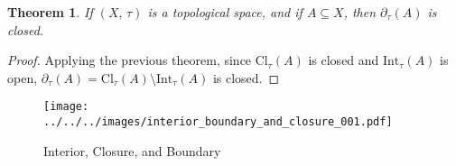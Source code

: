 \documentclass{article}
\theoremstyle{plain}
\newtheorem{theorem}{Theorem}[section]
\theoremstyle{normal}
\begin{document}
        \begin{theorem}
            If $(X,\,\tau)$ is a topological space, and if $A\subseteq{X}$,
            then $\partial_{\tau}(A)$ is closed.
        \end{theorem}
        \begin{proof}
            Applying the previous theorem, since $\textrm{Cl}_{\tau}(A)$ is
            closed and $\textrm{Int}_{\tau}(A)$ is open,
            $\partial_{\tau}(A)=\textrm{Cl}_{\tau}(A)\setminus\textrm{Int}_{\tau}(A)$
            is closed.
        \end{proof}
        \begin{figure}
            \centering
            \texttt{[image: ../../../images/interior\_boundary\_and\_closure\_001.pdf]}
            \caption{Interior, Closure, and Boundary}
            \label{fig:interior_boundary_and_closure_001}
        \end{figure}
\end{document}
